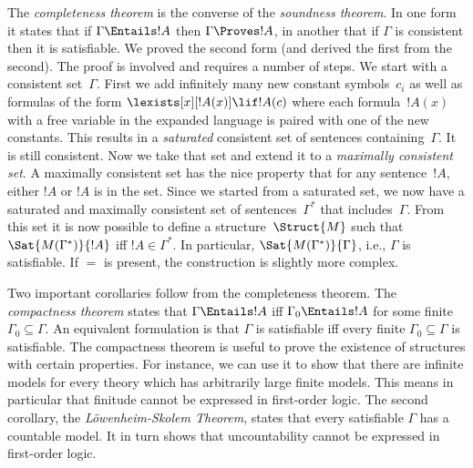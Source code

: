 The \emph{completeness theorem} is the converse of the \emph{soundness
  theorem}. In one form it states that if $\Gamma \Entails !A$ then
$\Gamma \Proves !A$, in another that if $\Gamma$ is consistent then it
is satisfiable. We proved the second form (and derived the first from
the second). The proof is involved and requires a number of steps. We
start with a consistent set~$\Gamma$.  First we add infinitely many
new constant symbols~$c_i$ as well as formulas of the form
$\lexists[x][!A(x)] \lif !A(c)$ where each formula~$!A(x)$ with a free
variable in the expanded language is paired with one of the new
constants. This results in a \emph{saturated} consistent set of
sentences containing~$\Gamma$. It is still consistent. Now we take
that set and extend it to a \emph{maximally consistent set}.  A
maximally consistent set has the nice property that for any
sentence~$!A$, either $!A$ or $!A$ is in the set. Since we started
from a saturated set, we now have a saturated and maximally consistent
set of sentences~$\Gamma^*$ that includes~$\Gamma$. From this set it
is now possible to define a structure~$\Struct{M}$ such that
$\Sat{M(\Gamma^*)}{!A}$ iff $!A \in \Gamma^*$. In particular,
$\Sat{M(\Gamma^*)}{\Gamma}$, i.e., $\Gamma$ is satisfiable.  If $=$ is
present, the construction is slightly more complex.

Two important corollaries follow from the completeness theorem. The
\emph{compactness theorem} states that $\Gamma \Entails !A$ iff
$\Gamma_0 \Entails !A$ for some finite $\Gamma_0 \subseteq \Gamma$. An
equivalent formulation is that $\Gamma$ is satisfiable iff every
finite $\Gamma_0 \subseteq \Gamma$ is satisfiable. The compactness
theorem is useful to prove the existence of structures with certain
properties. For instance, we can use it to show that there are
infinite models for every theory which has arbitrarily large finite
models.  This means in particular that finitude cannot be expressed in
first-order logic.  The second corollary, the \emph{L\"owenheim-Skolem
  Theorem}, states that every satisfiable $\Gamma$ has a countable
model. It in turn shows that uncountability cannot be expressed in
first-order logic.
